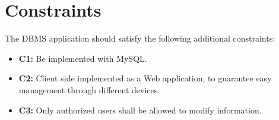 \section{Constraints}

The DBMS application should satisfy the following additional constraints:

\begin{itemize}
    \item \textbf{C1:} Be implemented with MySQL.
    
    \item \textbf{C2:} Client side implemented as a Web application, to guarantee easy management through different devices.
    
    \item \textbf{C3:} Only authorized users shall be allowed to modify information.

 \end{itemize}